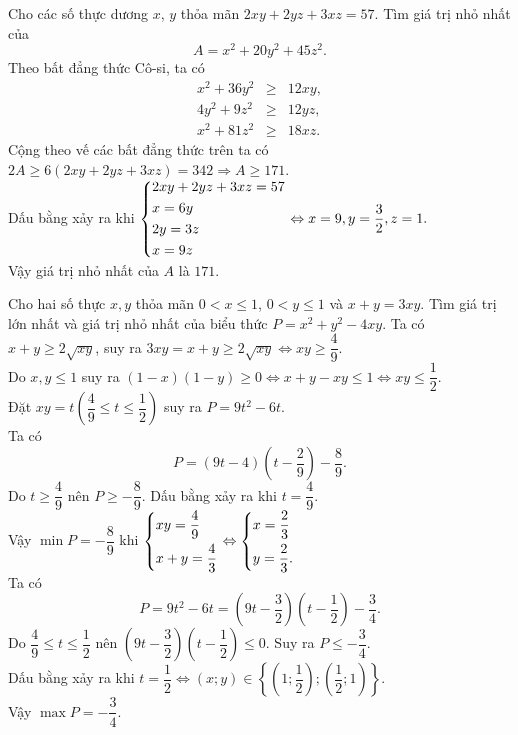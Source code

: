\begin{bt}%
	Cho các số thực dương $x$, $y$ thỏa mãn $2xy+2yz+3xz=57$. Tìm giá trị nhỏ nhất của $$A=x^2+20y^2+45z^2.$$
	\loigiai
	{Theo bất đẳng thức Cô-si, ta có
		{\allowdisplaybreaks
		\begin{eqnarray*}
			x^2+36y^2 &\ge & 12xy,\\
			4y^2+9z^2 &\ge & 12yz,\\
			x^2+81z^2 &\ge & 18xz.
		\end{eqnarray*}}
		Cộng theo vế các bất đẳng thức trên ta có $2A \ge 6(2xy+2yz+3xz)=342 \Rightarrow A \ge 171$.\\
		Dấu bằng xảy ra khi $ \left\{\begin{aligned}& 2xy +2yz +3xz =57 \\ & x=6y \\ & 2y =3z  \\ & x=9z\end{aligned}\right. \Leftrightarrow x=9,y=\dfrac{3}{2},z=1.$\\
		Vậy giá trị nhỏ nhất của $A$ là $171$.
	}
\end{bt}

\begin{bt}%
	Cho hai số thực $x, y$ thỏa mãn $0<x \le 1$, $0<y \le 1$ và $x+y=3xy$. Tìm giá trị lớn nhất và giá trị nhỏ nhất của biểu thức $P=x^2+y^2-4xy$.
	\loigiai
	{Ta có $x+y \ge 2\sqrt{xy}$, suy ra $3xy =x+y \geq 2 \sqrt{xy} \Leftrightarrow xy \ge \dfrac{4}{9}$.\\
		Do $x, y \le 1$ suy ra $(1-x)(1-y) \ge 0 \Leftrightarrow x+y-xy \le 1 \Leftrightarrow xy \le \dfrac{1}{2}$.\\
		Đặt $xy=t \left( \dfrac{4}{9} \le t \le \dfrac{1}{2}\right)$ suy ra $P=9t^2-6t$.\\
		Ta có $$P=(9t-4)\left(t-\dfrac{2}{9}\right)-\dfrac{8}{9}.$$
		Do $t \ge \dfrac{4}{9}$ nên $P \ge -\dfrac{8}{9}$. 
		Dấu bằng xảy ra khi $t=\dfrac{4}{9}$.\\
		Vậy $\min{P}=-\dfrac{8}{9}$ khi $\left\{\begin{aligned}&xy=\dfrac{4}{9} \\&x+y=\dfrac{4}{3}\end{aligned}\right. \Leftrightarrow \left\{\begin{aligned}&x=\dfrac{2}{3} \\ &y=\dfrac{2}{3}.\end{aligned}\right.$\\
		Ta có 
		\[P=9t^2-6t=\left(9t- \dfrac{3}{2}\right) \left( t-\dfrac{1}{2}\right)-\dfrac{3}{4}. \]
		Do $\dfrac{4}{9} \le t \le \dfrac{1}{2}$ nên $\left(9t- \dfrac{3}{2}\right) \left( t-\dfrac{1}{2}\right) \le 0$. Suy ra $P \le -\dfrac{3}{4}$.\\
		Dấu bằng xảy ra khi $t=\dfrac{1}{2} \Leftrightarrow (x;y) \in \left\{ \left( 1; \dfrac{1}{2}\right); \left( \dfrac{1}{2}; 1 \right)\right\}$.\\
		Vậy $\max{P}=-\dfrac{3}{4}$.
	}
\end{bt} 